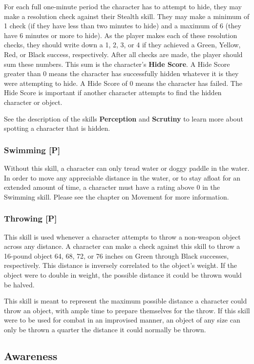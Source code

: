 \documentclass[oneside]{book}
\begin{document}
\begin{multicols}{2}
 For each full one-minute period the character has to attempt to hide, they may make a resolution check against their Stealth skill. They may make a minimum of 1 check (if they have less than two minutes to hide) and a maximum of 6 (they have 6 minutes or more to hide). As the player makes each of these resolution checks, they should write down a 1, 2, 3, or 4 if they achieved a Green, Yellow, Red, or Black success, respectively. After all checks are made, the player should sum these numbers. This sum is the character's \textbf{Hide Score}. A Hide Score greater than 0 means the character has successfully hidden whatever it is they were attempting to hide. A Hide Score of 0 means the character has failed. The Hide Score is important if another character attempts to find the hidden character or object.

See the description of the skills \textbf{Perception} and \textbf{Scrutiny} to learn more about spotting a character that is hidden. 

\subsubsection{Swimming [P]}
Without this skill, a character can only tread water or doggy paddle in the water. In order to move any appreciable distance in the water, or to stay afloat for an extended amount of time, a character must have a rating above 0 in the Swimming skill. Please see the chapter on Movement for more information.

\subsubsection{Throwing [P]}
This skill is used whenever a character attempts to throw a non-weapon object across any distance. A character can make a check against this skill to throw a 16-pound object 64, 68, 72, or 76 inches on Green through Black successes, respectively. This distance is inversely correlated to the object's weight. If the object were to double in weight, the possible distance it could be thrown would be halved. 

This skill is meant to represent the maximum possible distance a character could throw an object, with ample time to prepare themselves for the throw. If this skill were to be used for combat in an improvised manner, an object of any size can only be thrown a quarter the distance it could normally be thrown.

\subsection{Awareness}

\end{multicols}
\end{document}

